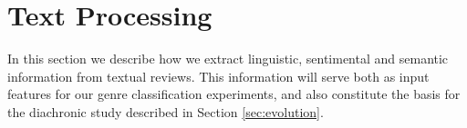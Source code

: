


\section{Text Processing}

In this section we describe how we extract linguistic, sentimental and semantic information from textual reviews. This information will serve both as input features for our genre classification experiments, and also constitute the basis for the diachronic study described in Section \ref{sec:evolution}.

